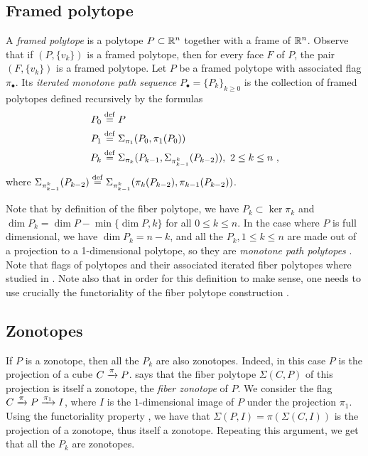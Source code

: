 \subsection{Framed polytope}

A \textit{framed polytope} is a polytope $P \subset \mathbb{R}^n$ together with a frame of $\mathbb{R}^n$.
Observe that if $(P, \{v_k\})$ is a framed polytope, then for every face $F$ of $P$, the pair $(F, \{v_k\})$ is a framed polytope.
Let $P$ be a framed polytope with associated flag $\pi_\bullet$.
Its \textit{iterated monotone path sequence} $P_\bullet = \{P_k\}_{k \geq 0}$ is the collection of framed polytopes defined recursively by the formulas
\begin{align*}
	P_0 & \stackrel{\mathrm{def}}{=} P \\
	P_1 & \stackrel{\mathrm{def}}{=} \Sigma_{\pi_1}(P_0,\pi_1(P_0)) \\
	P_k & \stackrel{\mathrm{def}}{=} \Sigma_{\pi_k}(P_{k-1},\Sigma_{\pi^{k}_{k-1}}(P_{k-2})), \ 2 \leq k \leq n \ ,
\end{align*}
where $\Sigma_{\pi^{k}_{k-1}}(P_{k-2})\stackrel{\mathrm{def}}{=} \Sigma_{\pi^{k}_{k-1}}(\pi_k(P_{k-2}),\pi_{k-1}(P_{k-2}))$.


Note that by definition of the fiber polytope, we have $P_k \subset \ker \pi_k$ and $\dim P_k = \dim P - \min\{ \dim P,k\}$ for all $0\leq k \leq n$.
In the case where $P$ is full dimensional, we have $\dim P_k = n-k$, and all the $P_k, 1 \leq k \leq n$ are made out of a projection to a 1-dimensional polytope, so they are \emph{monotone path polytopes} \cite[Theorem 5.3]{BilleraSturmfels92}.
Note that flags of polytopes and their associated iterated fiber polytopes where studied in \cite{BilleraSturmfels94}.
Note also that in order for this definition to make sense, one needs to use crucially the functoriality of the fiber polytope construction \cite[Lemma 2.3]{BilleraSturmfels92}.


\subsection{Zonotopes} \label{ss:zonotopes}

If $P$ is a zonotope, then all the $P_k$ are also zonotopes.
Indeed, in this case $P$ is the projection of a cube $C \xrightarrow{\pi} P$.
\cite[Theorem 4.1]{BilleraSturmfels92} says that the fiber polytope $\Sigma(C,P)$ of this projection is itself a zonotope, the \emph{fiber zonotope} of $P$.
We consider the flag $C \xrightarrow{\pi} P \xrightarrow{\pi_1} I$, where $I$ is the $1$-dimensional image of $P$ under the projection $\pi_1$.
Using the functoriality property \cite[Lemma 2.3]{BilleraSturmfels92}, we have that $\Sigma(P,I)=\pi(\Sigma(C,I))$ is the projection of a zonotope, thus itself a zonotope.
Repeating this argument, we get that all the $P_k$ are zonotopes.

